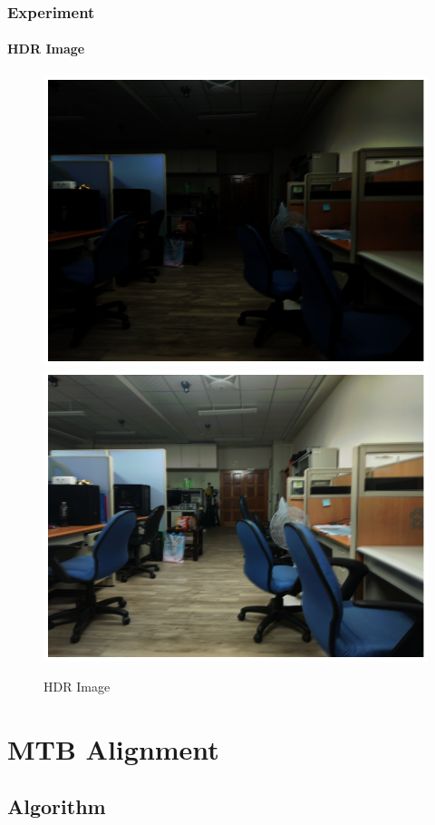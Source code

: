 \documentclass[
	11pt, %
	aspectratio=169, %
]{beamer}
\begin{document}
\begin{frame}
	\frametitle{Experiment}
	\framesubtitle{HDR Image}

	\begin{figure}
		\includegraphics[width=0.45\linewidth]{./Images/hdr_linear_map.png}
		\includegraphics[width=0.45\linewidth]{./Images/hdr_tone_map.png}
		\caption{HDR Image}
	\end{figure}
\end{frame}

\section{MTB Alignment}
\subsection{Algorithm}
\end{document}
